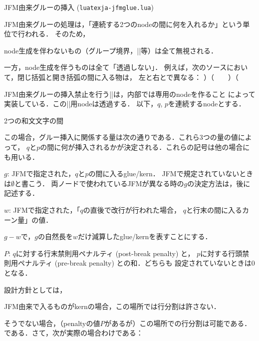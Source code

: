 \beginsection JFM由来グルーの挿入 ({\tt luatexja-jfmglue.lua})

JFM由来グルーの処理は，「連続する2つのnodeの間に何を入れるか」という単位で行われる．
そのため，
\item node生成を伴わないもの（グループ境界，|\relax|等）は全て無視される．
\item 一方，node生成を伴うものは全て「透過しない」．
例えば，次のソースにおいて，閉じ括弧と開き括弧の間に入る物は，
左と右とで異なる：
\begintt
）（　　）\hbox{}（
\endtt
\item JFM由来グルーの挿入禁止を行う|\inhibitglue|は，内部では専用のnodeを作ること
によって実装している．この|\inhibitglue|用nodeは透過する．
\enditem
以下，$q$, $p$を連続するnodeとする．


\beginparagraph 2つの和文文字の間

この場合，グルー挿入に関係する量は次の通りである．これら3つの量の値によって，
$q$と$p$の間に何が挿入されるかが決定される．これらの記号は他の場合にも用いる．
\item $g$: JFMで指定された，$q$と$p$の間に入るglue/kern．
JFMで規定されていないときは$\emptyset$と書こう．
両ノードで使われているJFMが異なる時の$g$の決定方法は，後に記述する．
\item $w$: JFMで指定された，「$q$の直後で改行が行われた場合，
$q$と行末の間に入るカーン量」の値．

$g-w$で，$g$の自然長を$w$だけ減算したglue/kernを表すことにする．

\item $P$: $q$に対する行末禁則用ペナルティ (post-break penalty) と，
$p$に対する行頭禁則用ペナルティ (pre-break penalty) との和．どちらも
設定されていないときは0となる．
\enditem

設計方針としては，
\item JFM由来で入るものがkernの場合，この場所では行分割は許さない．
\item そうでない場合，（penaltyの値$P$があるが）この場所での行分割は可能である．
\enditem
である．さて，次が実際の場合わけである：

